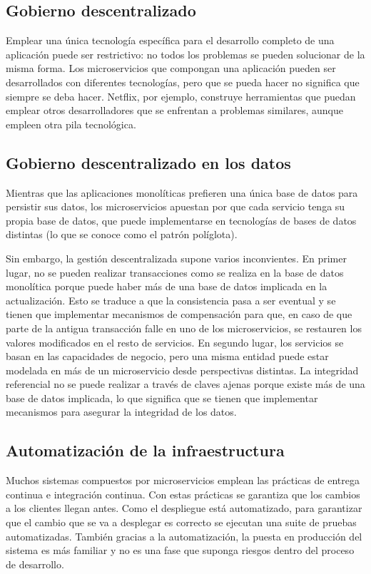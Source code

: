 \documentclass[11pt,a4paper]{article}
\begin{document}
\subsection{Gobierno descentralizado}

Emplear una única tecnología específica para el desarrollo completo de una aplicación puede ser restrictivo: no todos los problemas se pueden solucionar de la misma forma. Los microservicios que compongan una aplicación pueden ser desarrollados con diferentes tecnologías, pero que se pueda hacer no significa que siempre se deba hacer. Netflix, por ejemplo, construye herramientas que puedan emplear otros desarrolladores que se enfrentan a problemas similares, aunque empleen otra pila tecnológica.

\subsection{Gobierno descentralizado en los datos}

Mientras que las aplicaciones monolíticas prefieren una única base de datos para persistir sus datos, los microservicios apuestan por que cada servicio tenga su propia base de datos, que puede implementarse en tecnologías de bases de datos distintas (lo que se conoce como el patrón políglota).

Sin embargo, la gestión descentralizada supone varios inconvientes. En primer lugar, no se pueden realizar transacciones como se realiza en la base de datos monolítica porque puede haber más de una base de datos implicada en la actualización. Esto se traduce a que la consistencia pasa a ser eventual y se tienen que implementar mecanismos de compensación para que, en caso de que parte de la antigua transacción falle en uno de los microservicios, se restauren los valores modificados en el resto de servicios. En segundo lugar, los servicios se basan en las capacidades de negocio, pero una misma entidad puede estar modelada en más de un microservicio desde perspectivas distintas. La integridad referencial no se puede realizar a través de claves ajenas porque existe más de una base de datos implicada, lo que significa que se tienen que implementar mecanismos para asegurar la integridad de los datos.

\subsection{Automatización de la infraestructura}

Muchos sistemas compuestos por microservicios emplean las prácticas de entrega continua e integración continua. Con estas prácticas se garantiza que los cambios a los clientes llegan antes. Como el despliegue está automatizado, para garantizar que el cambio que se va a desplegar es correcto se ejecutan una suite de pruebas automatizadas. También gracias a la automatización, la puesta en producción del sistema es más familiar y no es una fase que suponga riesgos dentro del proceso de desarrollo.
\end{document}
